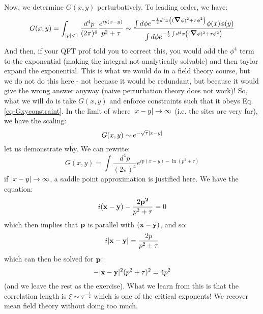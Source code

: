 Now, we determine $G(x, y)$ perturbatively. To leading order, we have:
\begin{equation}
    G(x, y) = \int_{\abs{p} < 1} \frac{d^{4}p}{(2\pi)^{4}}\frac{e^{ip(x-y)}}{p^2 + \tau} \sim \frac{\int d\phi e^{-\frac{1}{2}d^4x\left((\nabla \phi)^2 + \tau\phi^2\right)}\phi(x)\phi(y)}{\int d\phi e^{-\frac{1}{2}\int d^4x\left((\nabla \phi)^2 + \tau\phi^2\right)}}
\end{equation}
And then, if your QFT prof told you to correct this, you would add the $\phi^4$ term to the exponential (making the integral not analytically solvable) and then taylor expand the exponential. This is what we would do in a field theory course, but we do not do this here - not becuase it would be redundant, but because it would give the wrong answer anyway (naive perturbation theory does not work)! So, what we will do is take $G(x, y)$ and enforce constraints such that it obeys Eq. \eqref{eq-Gxyconstraint}. In the limit of where $\lvert x - y \rvert \to \infty$ (i.e. the sites are very far), we have the scaling:
\begin{equation}
    G(x, y) \sim e^{-\sqrt{\tau}\lvert x-y \rvert}
\end{equation}
let us demonstrate why. We can rewrite:
\begin{equation}
    G(x, y) = \int \frac{d^4p}{(2\pi)^4}e^{ip(x-y) - \ln(p^2 + \tau)} 
\end{equation}
if $\lvert x - y \rvert \to \infty$, a saddle point approximation is justified here. We have the equation:
\begin{equation}
    i(\mathbf{x} - \mathbf{y}) - \frac{2\mathbf{p^2}}{p^2 + \tau} = 0
\end{equation}
which then implies that $\mathbf{p}$ is parallel with $(\mathbf{x} - \mathbf{y})$, and so:
\begin{equation}
    i\lvert \mathbf{x} - \mathbf{y} \rvert = \frac{2p}{p^2 + \tau}
\end{equation}
which can then be solved for $\mathbf{p}$:
\begin{equation}
    -\lvert \mathbf{x} - \mathbf{y} \rvert^2(p^2 + \tau)^2 = 4p^2
\end{equation}
(and we leave the rest as the exercise). What we learn from this is that the correlation length is $\xi \sim \tau^{-\frac{1}{2}}$ which is one of the critical exponents! We recover mean field theory without doing too much.

